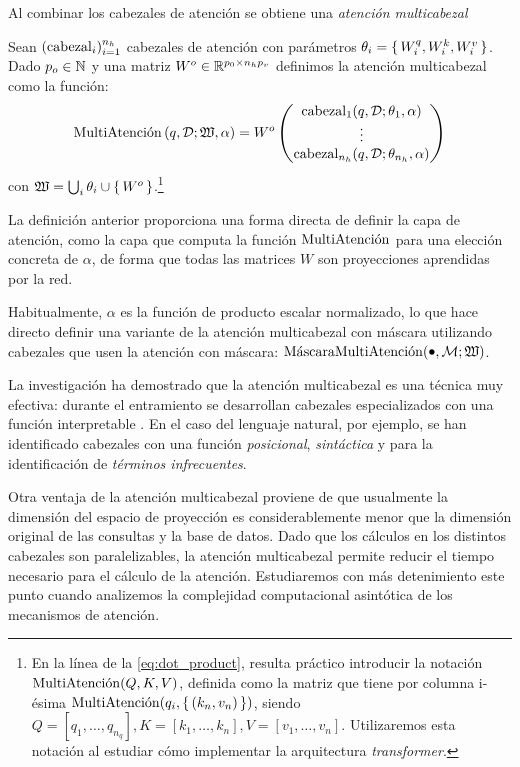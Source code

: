 Al combinar los cabezales de atención se obtiene una \textit{atención multicabezal}
\begin{definition}     
     Sean \( (\operatorname{cabezal}_{i})_{i = 1}^{n_h} \) cabezales de atención con parámetros \( \theta_{i} = \{\, W^q_{i}, W^k_{i}, W^v_{i} \,\} \). Dado \( p_o \in \mathbb{N} \) y una matriz \( W^o \in \mathbb{R}^{p_0 \times n_h p_v} \) definimos la atención multicabezal como la función:
     \[
        \operatorname{MultiAtenci\acute{o}n} \left(q, \mathcal{D}; \mathfrak{W}, \alpha \right) = W^o \begin{pmatrix} \operatorname{cabezal}_{1}(q, \mathcal{D}; \theta_{1}, \alpha) \\ \vdots \\ \operatorname{cabezal}_{n_h}(q, \mathcal{D}; \theta_{n_h}, \alpha) \end{pmatrix}
     \]
     con \( \mathfrak{W} = \bigcup_i \theta_i \cup \{\,W^o\,\} \).\footnote{En la línea de la \eqref{eq:dot_product}, resulta práctico introducir la notación \( \operatorname{MultiAtenci\acute{o}n}(Q, K, V) \), definida como la matriz que tiene por columna i-ésima \( \operatorname{MultiAtenci\acute{o}n}(q_i, \{\,(k_n, v_n)\,\}) \), siendo \( Q = [q_1, …, q_{n_q}], K = [k_1, …, k_n], V = [v_1, …, v_n] \). Utilizaremos esta notación al estudiar cómo implementar la arquitectura \textit{transformer}.}
\end{definition}

La definición anterior proporciona una forma directa de definir la capa de atención, como la capa que computa la función \( \operatorname{MultiAtenci\acute{o}n} \) para una elección concreta de \( \alpha \), de forma que todas las matrices \( W \) son proyecciones aprendidas por la red. 

Habitualmente, \( \alpha \) es la función de producto escalar normalizado, lo que hace directo definir una variante de la atención multicabezal con máscara utilizando cabezales que usen la atención con máscara: \( \mmultihead(\smallbullet, \mathcal{M}; \mathfrak{W}) 
\). 

La investigación ha demostrado que la atención multicabezal es una técnica muy efectiva: durante el entramiento se desarrollan cabezales especializados con una función interpretable \cite{voita2019analyzing}. En el caso del lenguaje natural, por ejemplo, se han identificado cabezales con una función \textit{posicional}, \textit{sintáctica} y para la identificación de \textit{términos infrecuentes}.

Otra ventaja de la atención multicabezal proviene de que usualmente la dimensión del espacio de proyección es considerablemente menor que la dimensión original de las consultas y la base de datos. Dado que los cálculos en los distintos cabezales son paralelizables, la atención multicabezal permite reducir el tiempo necesario para el cálculo de la atención. Estudiaremos con más detenimiento este punto cuando analizemos la complejidad computacional asintótica de los mecanismos de atención.

